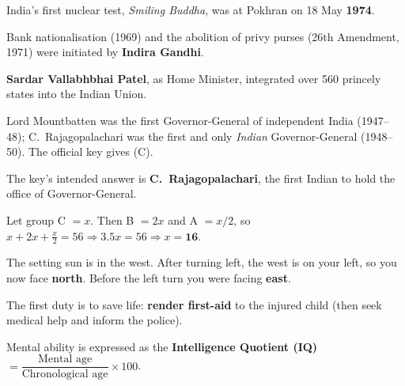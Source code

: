 India's first nuclear test, \emph{Smiling Buddha}, was at Pokhran on 18 May \textbf{1974}.

Bank nationalisation (1969) and the abolition of privy purses (26th Amendment, 1971) were initiated by \textbf{Indira Gandhi}.

\textbf{Sardar Vallabhbhai Patel}, as Home Minister, integrated over 560 princely states into the Indian Union.

Lord Mountbatten was the first Governor-General of independent India (1947--48); C.~Rajagopalachari was the first and only \emph{Indian} Governor-General (1948--50). The official key gives (C).

The key's intended answer is \textbf{C.~Rajagopalachari}, the first Indian to hold the office of Governor-General.

Let group C $=x$. Then B $=2x$ and A $=x/2$, so $x+2x+\tfrac x2=56\Rightarrow3.5x=56\Rightarrow x=\mathbf{16}$.

The setting sun is in the west. After turning left, the west is on your left, so you now face \textbf{north}. Before the left turn you were facing \textbf{east}.

The first duty is to save life: \textbf{render first-aid} to the injured child (then seek medical help and inform the police).

Mental ability is expressed as the \textbf{Intelligence Quotient (IQ)} $=\dfrac{\text{Mental age}}{\text{Chronological age}}\times100$.

